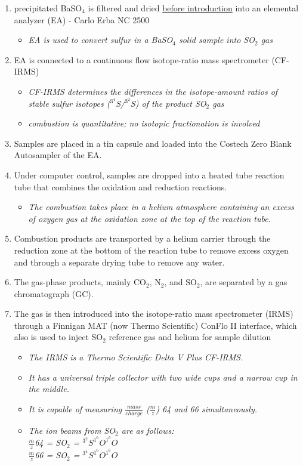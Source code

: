 \documentclass[a4paper,twoside,11pt]{article}
\begin{document}
\begin{enumerate}
    \item precipitated BaSO$_4$ is filtered and dried \hyperlink{thesentence3}{before introduction} into an elemental analyzer (EA) - Carlo Erba NC 2500
    \begin{itemize}
        \item \textit{EA is used to convert sulfur in a BaSO$_4$ solid sample into SO$_2$ gas}
    \end{itemize}
    \item EA is connected to a continuous flow isotope-ratio mass spectrometer (CF-IRMS)
    \begin{itemize}
        \item \textit{CF-IRMS determines the differences in the isotope-amount ratios of stable sulfur isotopes ($^3^4$S/$^3^2$S) of the product SO$_2$ gas}
        \item \textit{combustion is quantitative; no isotopic fractionation is involved}
    \end{itemize}
    \item Samples are placed in a tin capsule and loaded into the Costech Zero Blank Autosampler of the EA.
    \item Under computer control, samples are dropped into a heated tube reaction tube that combines the oxidation and reduction reactions.
    \begin{itemize}
        \item \textit{The combustion takes place in a helium atmosphere containing an excess of oxygen gas at the oxidation zone at the top of the reaction tube.}
    \end{itemize}
    \item Combustion products are transported by a helium carrier through the reduction zone at the bottom of the reaction tube to remove excess oxygen and through a separate drying tube to remove any water.
    \item The gas-phase products, mainly CO$_2$, N$_2$, and SO$_2$, are separated by a gas chromatograph (GC).
    \item The gas is then introduced into the isotope-ratio mass spectrometer (IRMS) through a Finnigan MAT (now Thermo Scientific) ConFlo II interface, which also is used to inject SO$_2$ reference gas and helium for sample dilution
    \begin{itemize}
        \item \textit{The IRMS is a Thermo Scientific Delta V Plus CF-IRMS.}
        \item \textit{It has a universal triple collector with two wide cups and a narrow cup in the middle.}
        \item \textit{It is capable of measuring $\frac{mass}{charge}$ ($\frac{m}{z}$) 64 and 66 simultaneously.}
        \item \textit{The ion beams from SO$_2$ are as follows: \\ $\frac{m}{z}$64 = SO$_2$ = $^3^2S^1^6O^1^6O$ \\ $\frac{m}{z}$66 = SO$_2$ = $^3^4S^1^6O^1^6O$}
    \end{itemize}
\end{enumerate}
\end{document}
